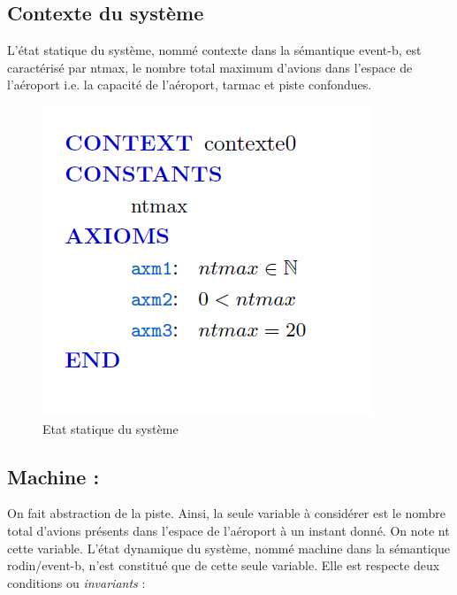 \subsection{Contexte du système}
L'état statique du système, nommé contexte dans la sémantique event-b, est caractérisé par ntmax, le nombre total maximum d'avions dans  l'espace de l'aéroport i.e. la capacité de l'aéroport, tarmac et piste confondues.
\begin{figure}[H]
	\begin{center}	
		\includegraphics[scale=0.8]{images/0/ctx0}
		\caption{Etat statique du système}
		\label{ctx0}
	\end{center}
\end{figure}

\subsection{Machine :}

On fait abstraction de la piste. Ainsi, la seule variable à considérer est le nombre total d'avions présents dans l'espace de l'aéroport à un instant donné. On note nt cette variable. L'état dynamique du système, nommé machine dans la sémantique rodin/event-b, n'est constitué que de cette seule variable. Elle est respecte deux conditions ou \textit{invariants} :

